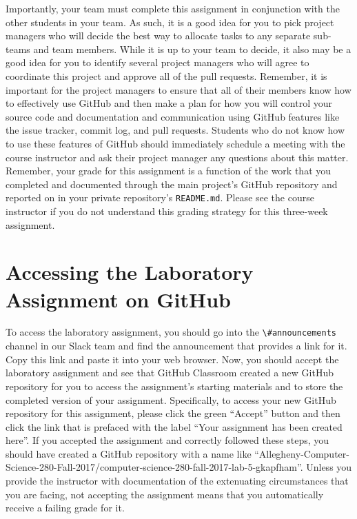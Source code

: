 \documentclass[11pt]{article}
\newcommand{\reflection}{\lstinline{README.md}}
\newcommand{\channel}[1]{\lstinline{#1}}
\begin{document}
Importantly, your team must complete this assignment in conjunction with the other students in your team. As such, it is
a good idea for you to pick project managers who will decide the best way to allocate tasks to any separate sub-teams
and team members. While it is up to your team to decide, it also may be a good idea for you to identify several project
managers who will agree to coordinate this project and approve all of the pull requests. Remember, it is important for
the project managers to ensure that all of their members know how to effectively use GitHub and then make a plan for how
you will control your source code and documentation and communication using GitHub features like the issue tracker,
commit log, and pull requests. Students who do not know how to use these features of GitHub should immediately schedule
a meeting with the course instructor and ask their project manager any questions about this matter. Remember, your grade
for this assignment is a function of the work that you completed and documented through the main project's GitHub
repository and reported on in your private repository's \reflection{}. Please see the course instructor if you do not
understand this grading strategy for this three-week assignment.

\section*{Accessing the Laboratory Assignment on GitHub}

To access the laboratory assignment, you should go into the \channel{\#announcements} channel in our Slack team and find
the announcement that provides a link for it. Copy this link and paste it into your web browser. Now, you should accept
the laboratory assignment and see that GitHub Classroom created a new GitHub repository for you to access the
assignment's starting materials and to store the completed version of your assignment. Specifically, to access your new
GitHub repository for this assignment, please click the green ``Accept'' button and then click the link that is prefaced
with the label ``Your assignment has been created here''. If you accepted the assignment and correctly followed these
steps, you should have created a GitHub repository with a name like
``Allegheny-Computer-Science-280-Fall-2017/computer-science-280-fall-2017-lab-5-gkapfham''. Unless you provide the
instructor with documentation of the extenuating circumstances that you are facing, not accepting the assignment means
that you automatically receive a failing grade for it.
\end{document}
